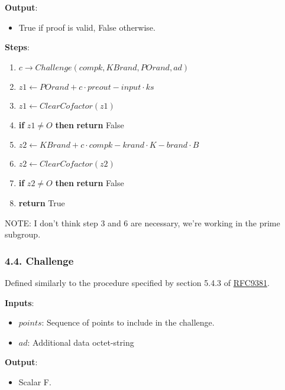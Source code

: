 \documentclass[
]{article}
\providecommand{\tightlist}{%
  \setlength{\itemsep}{0pt}\setlength{\parskip}{0pt}}
\begin{document}
\textbf{Output}:

\begin{itemize}
\tightlist
\item
  True if proof is valid, False otherwise.
\end{itemize}

\textbf{Steps}:

\begin{enumerate}
\def\labelenumi{\arabic{enumi}.}
\tightlist
\item
  \(c \rightarrow Challenge(compk, KBrand, POrand, ad)\)
\item
  \(z1 \leftarrow POrand + c \cdot preout - input \cdot ks\)
\item
  \(z1 \leftarrow ClearCofactor(z1)\)
\item
  \textbf{if} \(z1 \neq O\) \textbf{then} \textbf{return} False
\item
  \(z2 \leftarrow KBrand + c \cdot compk - krand \cdot K - brand \cdot B\)
\item
  \(z2 \leftarrow ClearCofactor(z2)\)
\item
  \textbf{if} \(z2 \neq O\) \textbf{then} \textbf{return} False
\item
  \textbf{return} True
\end{enumerate}

NOTE: I don't think step 3 and 6 are necessary, we're working in the
prime subgroup.

\hypertarget{challenge}{%
\subsubsection{4.4. Challenge}\label{challenge}}

Defined similarly to the procedure specified by section 5.4.3 of
\href{https://datatracker.ietf.org/doc/rfc9381/}{RFC9381}.

\textbf{Inputs}:

\begin{itemize}
\tightlist
\item
  \(points\): Sequence of points to include in the challenge.
\item
  \(ad\): Additional data octet-string
\end{itemize}

\textbf{Output}:

\begin{itemize}
\tightlist
\item
  Scalar \in F.
\end{itemize}
\end{document}
